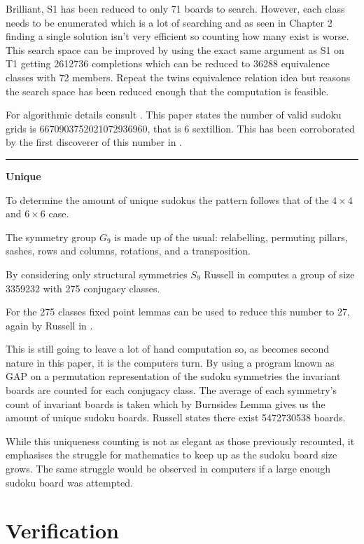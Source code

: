 \documentclass[a4paper,11pt]{report}
\newcounter{row}
\newcounter{col}
\begin{document}
Brilliant, S1 has been reduced to only 71 boards to search. However, each class needs to be enumerated which is a lot of searching and as seen in Chapter 2 finding a single solution isn't very efficient so counting how many exist is worse. This search space can be improved by using the exact same argument as S1 on T1 getting 2612736 completions which can be reduced to 36288 equivalence classes with 72 members. Repeat the twins equivalence relation idea but \cite{felgenhauer2005enumerating} reasons the search space has been reduced enough that the computation is feasible.

For algorithmic details consult \cite{felgenhauer2005enumerating}. This paper states the number of valid sudoku grids is
6670903752021072936960, that is 6 sextillion. This has been corroborated by the first discoverer of this number in \cite{lin2004number}.
\noindent\rule{4cm}{0.4pt}
\textbf{Unique} 

To determine the amount of unique sudokus the pattern follows that of the $4\times 4$ and $6\times 6$ case. 

The symmetry group $G_9$ is made up of the usual: relabelling, permuting pillars, sashes, rows and columns, rotations, and a transposition. 

By considering only structural symmetries $S_9$ Russell in \cite{russell2006mathematics} computes a group of size 3359232 with 275 conjugacy classes. 

For the 275 classes fixed point lemmas can be used to reduce this number to 27, again by Russell in \cite{russell2006mathematics}.

This is still going to leave a lot of hand computation so, as becomes second nature in this paper, it is the computers turn. By using a program known as GAP \cite{GAP2021} on a permutation representation of the sudoku symmetries the invariant boards are counted for each conjugacy class. The average of each symmetry's count of invariant boards is taken which by Burnsides Lemma gives us the amount of unique sudoku boards. Russell \cite{russell2006mathematics} states there exist 5472730538 boards.

While this uniqueness counting is not as elegant as those previously recounted, it emphasises the struggle for mathematics to keep up as the sudoku board size grows. The same struggle would be observed in computers if a large enough sudoku board was attempted.

\section{Verification}
\end{document}
